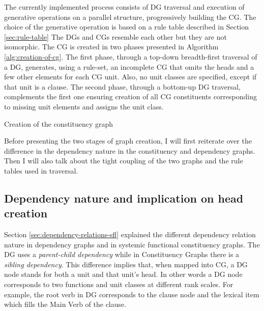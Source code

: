     The currently implemented process consists of DG traversal and execution of generative operations on a parallel structure, progressively building the CG. The choice of the generative operation is based on a rule table described in Section \ref{sec:rule-table} The DGs and CGs resemble each other but they are not isomorphic. The CG is created in two phases presented in Algorithm \ref{alg:creation-of-cg}. The first phase, through a top-down breadth-first traversal of a DG, generates, using a rule-set, an incomplete CG that omits the heads and a few other elements for each CG unit. Also, no unit classes are specified, except if that unit is a clause. The second phase, through a bottom-up DG traversal, complements the first one ensuring creation of all CG constituents corresponding to missing unit elements and assigns the unit class. 

    \begin{algorithm}[!ht]
    	\caption{Creation of the constituency graph}
    	\label{alg:creation-of-cg}
    \end{algorithm}

    Before presenting the two stages of graph creation, I will first reiterate over the difference in the dependency nature in the constituency and dependency graphs. Then I will also talk about the tight coupling of the two graphs and the rule tables used in traversal. 

\subsection{Dependency nature and implication on head creation}
\label{sec:dep-implications}
    Section \ref{sec:dependency-relations-sfl} explained the different dependency relation nature in dependency graphs and in systemic functional constituency graphs. The DG uses a \textit{parent-child dependency} while in Constituency Graphs there is a \textit{sibling dependency}. This difference implies that, when mapped into CG, a DG node stands for both a unit and that unit's head. In other words a DG node corresponds to two functions and unit classes at different rank scales. For example, the root verb in DG corresponds to the clause node and the lexical item which fills the Main Verb of the clause. 


